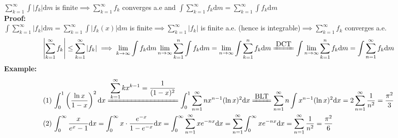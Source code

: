 \documentclass{article}
\newcommand{\sumkinf}{\displaystyle\sum_{k=1}^\infty}
\newcommand{\sumninf}{\displaystyle\sum_{n=1}^\infty}
\newcommand{\sumkn}{\displaystyle\sum_{k=1}^n}
\newcommand{\limninf}{\displaystyle\lim_{n\to\infty}}
\newcommand{\limkinf}{\displaystyle\lim_{k\to\infty}}
\newcommand{\0}{{\bf{0}}}
\newcommand{\1}{{\bf{1}}}
\newcommand{\dint}{\displaystyle\int}
\newcommand{\dif}{\mbox{d}}
\begin{document}
$\sumkinf\dint|f_k|\dif m$ is finite$\implies\sumkinf f_k$ converges a.e and $\dint\sumkinf f_k\dif m=\sumkinf\dint f_k\dif m$\\
\textbf{Proof:}\\
$\dint\sumkinf|f_k|\dif m=\sumkinf\dint|f_k(x)|\dif m$ is finite$\implies\sumkinf|f_k|$ is finite a.e. (hence is integrable)$\implies\sumkinf f_k$ converges a.e.\\
$$\left|\sumkinf f_k\right|\le\sumkinf|f_k|\implies\limkinf\dint f_k\dif m\limninf\sumkn\dint f_k\dif m=\limninf\dint\sumkn f_k\dif m\xlongequal{\mbox{DCT}}\dint\limninf\sumkn f_k\dif m=\dint\sumninf f_k\dif m$$
\textbf{Example:}
\begin{equation}
\begin{split}
    (1)\,&\int_0^1\left(\frac{\ln x}{1-x}\right)^2\dif x\xlongequal{\sumkinf kx^{k-1}=\frac{1}{(1-x)^2}}\dint_0^1\sumninf nx^{n-1}(\ln x)^2\dif x\xlongequal{\mbox{BLT}}\sumninf n\dint x^{n-1}(\ln x)^2\dif x=2\sumninf\frac{1}{n^2}=\frac{\pi^2}{3}\\
    (2)\,&\int_0^\infty\frac{x}{e^x-1}\dif x=\int_0^\infty x\cdot\frac{e^{-x}}{1-e^{-x}}\dif x=\int_0^\infty\sumninf xe^{-nx}\dif x=\sumninf\int_0^\infty xe^{-nx}\dif x=\sumninf\frac{1}{n^2}=\frac{\pi^2}{6}
\end{split}
\end{equation}
\end{document}
